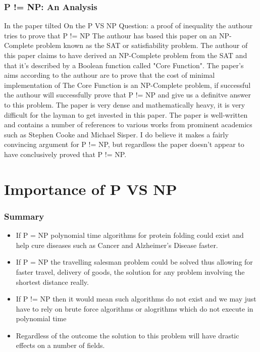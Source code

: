 \documentclass{report}
\begin{document}
\subsection{P != NP: An Analysis}
In the paper tilted On the P VS NP Question: a proof of inequality the authour tries to prove that P != NP\cite{P!=NP} The authour has based this paper on an NP-Complete problem known as the SAT or satisfiability problem\cite{satisfiability}. The authour of this paper claims to have derived an NP-Complete problem from the SAT and that it's described by a Boolean function called "Core Function".  The paper's aims according to the authour are to prove that the cost of minimal implementation of The Core Function is an NP-Complete problem, if successful the authour will successfully prove that P != NP and give us a definitve answer to this problem.  The paper is very dense and mathematically heavy, it is very difficult for the layman to get invested in this paper.  The paper is well-written and contains a number of references to various works from prominent academics such as Stephen Cooke and Michael Sisper.  I do believe it makes a fairly convincing argument for P != NP, but regardless the paper doesn't appear to have conclusively proved that P != NP.
\chapter{Importance of P VS NP}
\subsection{Summary}
\begin{itemize}
  \item If P = NP polynomial time algorithms for protein folding could exist and help cure diseases such as Cancer and Alzheimer's Disease faster.
  \item If P = NP the travelling salesman problem could be solved thus allowing for faster travel, delivery of goods, the solution for any problem involving the shortest distance really.
  \item If P != NP then it would mean such algorithms do not exist and we may just have to rely on brute force algorithms or alogrithms which do not execute in polynomial time
  \item Regardless of the outcome the solution to this problem will have drastic effects on a number of fields.
\end{itemize}
\end{document}
